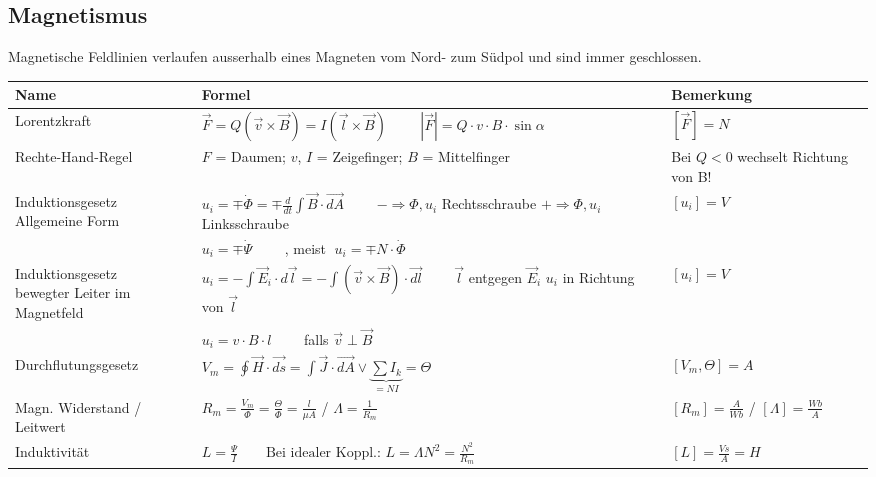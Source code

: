 \subsection{Magnetismus}

Magnetische Feldlinien verlaufen ausserhalb eines Magneten vom Nord- zum Südpol
und sind immer geschlossen.\\ 
	
	\begin{tabular}[c]{ | p{5cm} | p{8.7cm} | p{4cm} | }
		\hline
		\textbf{Name} & \textbf{Formel} & \textbf{Bemerkung}\\    
		\hline
		\hline
		Lorentzkraft
		& $\vec{F} = Q (\vec{v} \times \vec{B})=I(\vec{l}\times \vec{B}) \hspace{1cm} |\vec{F}| = Q \cdot v \cdot B
		\cdot \sin\alpha$
		&$[\vec{F}]= N$\\
		\hline
		Rechte-Hand-Regel
		& $F$ = Daumen; $v$, $I$ = Zeigefinger; $B$ = Mittelfinger
		& Bei $Q < 0$ wechselt Richtung von B!\\
		\hline
		\parbox{5cm}{Induktionsgesetz\\ \tiny{Allgemeine Form}} &
		$u_i= \mp \dot{\Phi} = \mp \frac{d}{dt} \int \vec{B} \cdot
		\vec{dA}\qquad $ \parbox{3cm}{\tiny{$- \Rightarrow \Phi,u_i $
		Rechtsschraube\\ $+ \Rightarrow \Phi,u_i $
		Linksschraube}} & $[u_i]= V$\\
		& $u_i= \mp \dot{\Psi}\qquad$ , meist $\; u_i = \mp
		N\cdot\dot{\Phi}$ &
		\\
		\hline
		\parbox{5cm}{Induktionsgesetz\\ \tiny{bewegter Leiter im Magnetfeld}} &
		$u_i=-\int\vec{E}_i \cdot
		d\vec{l}=-\int(\vec{v}\times \vec{B})\cdot\vec{dl}\qquad$
		\parbox{3cm}{\tiny{$\vec{l}$ entgegen $\vec{E}_i$\\
		$u_i$ in Richtung von $\vec{l}$}} & $[u_i]= V$\\
		& $u_i=v\cdot B \cdot l\qquad$ falls $\vec{v}\perp \vec{B}$ &\\	

		\hline		
		Durchflutungsgesetz
		& $V_m = \oint\vec{H} \cdot \vec{ds} = \int\limits \vec{J}
		\cdot \vec{dA} \vee \underbrace{\sum I_k}_{= N I} = \Theta$
		& $[V_m,\Theta]=A$\\
		\hline
		Magn. Widerstand / Leitwert
		& $R_m = \frac{V_m}{\Phi} = \frac{\Theta}{\Phi} = \frac{l}{\mu A} $ \quad / \quad
		$\Lambda = \frac{1}{R_m}$ & $[R_m]=\frac{A}{Wb}$\;
		/ \;$[\Lambda]=\frac{Wb}{A}$
		\\
		\hline
		Induktivität
		& $L = \frac{\Psi}{I}  \qquad \text{Bei idealer Koppl.: } L = \Lambda N^2 = \frac{N^2}{R_m} $
		& $[L] = \frac{Vs}{A} = H$\\
		\hline
	\end{tabular}\\
	
